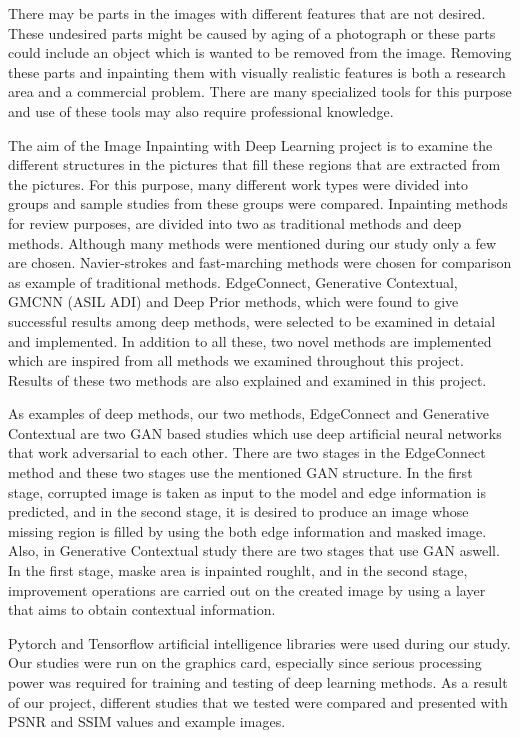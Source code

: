 There may be parts in the images with different features that are not desired. These undesired parts might be caused by aging of a photograph or these parts could include an object which is wanted to be removed from the image. Removing these parts and inpainting them with visually realistic features is both a research area and a commercial problem. There are many specialized tools for this purpose and use of these tools may also require professional knowledge.

The aim of the Image Inpainting with Deep Learning project is to examine the different structures in the pictures that fill these regions that are extracted from the pictures. For this purpose, many different work types were divided into groups and sample studies from these groups were compared. Inpainting methods for review purposes, are divided into two as traditional methods and deep methods. Although many methods were mentioned during our study only a few are chosen. Navier-strokes and fast-marching methods were chosen for comparison as example of traditional methods. EdgeConnect, Generative Contextual, GMCNN (ASIL ADI) and Deep Prior methods, which were found to give successful results among deep methods, were selected to be examined in detaial and implemented. In addition to all these, two novel methods are implemented which are inspired from all methods we examined throughout this project. Results of these two methods are also explained and examined in this project.

As examples of deep methods, our two methods, EdgeConnect and Generative Contextual are two GAN based studies which use deep artificial neural networks that work adversarial to each other. There are two stages in the EdgeConnect method and these two stages use the mentioned GAN structure. In the first stage, corrupted image is taken as input to the model and edge information is predicted, and in the second stage, it is desired to produce an image whose missing region is filled by using the both edge information and masked image. Also, in Generative Contextual study there are two stages that use GAN aswell. In the first stage, maske area is inpainted roughlt, and in the second stage, improvement operations are carried out on the created image by using a layer that aims to obtain contextual information.


Pytorch and Tensorflow artificial intelligence libraries were used during our study. Our studies were run on the graphics card, especially since serious processing power was required for training and testing of deep learning methods. As a result of our project, different studies that we tested were compared and presented with PSNR and SSIM values and example images.